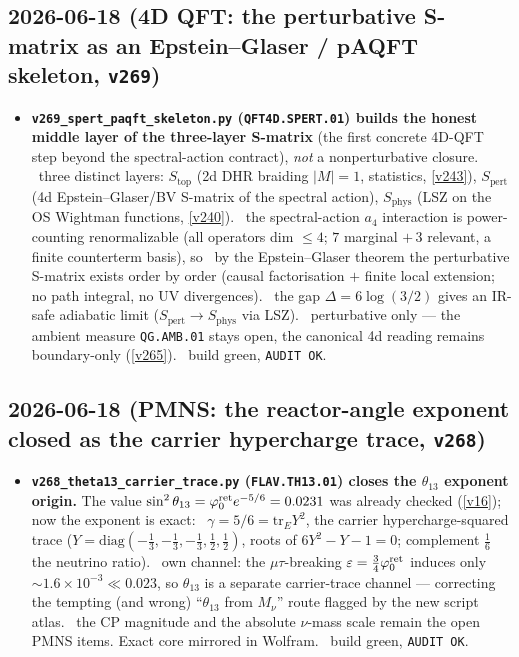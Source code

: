 \subsection*{2026-06-18 (4D QFT: the perturbative S-matrix as an Epstein--Glaser / pAQFT skeleton, \texttt{v269})}
\begin{itemize}
\item \textbf{\texttt{v269\_spert\_paqft\_skeleton.py} (\texttt{QFT4D.SPERT.01}) builds the honest middle
  layer of the three-layer S-matrix} (the first concrete 4D-QFT step beyond the spectral-action contract),
  \emph{not} a nonperturbative closure. \mE\ three distinct layers: $S_{\mathrm{top}}$ (2d DHR braiding
  $|M|{=}1$, statistics, \vref{v243}), $S_{\mathrm{pert}}$ (4d Epstein--Glaser/BV S-matrix of the spectral
  action), $S_{\mathrm{phys}}$ (LSZ on the OS Wightman functions, \vref{v240}). \mE\ the spectral-action
  $a_4$ interaction is power-counting renormalizable (all operators dim $\le4$; $7$ marginal $+\,3$ relevant,
  a finite counterterm basis), so \mC\ by the Epstein--Glaser theorem the perturbative S-matrix exists order
  by order (causal factorisation $+$ finite local extension; no path integral, no UV divergences). \mC\ the
  gap $\Delta=6\log(3/2)$ gives an IR-safe adiabatic limit ($S_{\mathrm{pert}}\to S_{\mathrm{phys}}$ via LSZ).
  \mO\ perturbative only --- the ambient measure \texttt{QG.AMB.01} stays open, the canonical 4d reading
  remains boundary-only (\vref{v265}). \mE\ build green, \texttt{AUDIT OK}.
\end{itemize}

\subsection*{2026-06-18 (PMNS: the reactor-angle exponent closed as the carrier hypercharge trace, \texttt{v268})}
\begin{itemize}
\item \textbf{\texttt{v268\_theta13\_carrier\_trace.py} (\texttt{FLAV.TH13.01}) closes the $\theta_{13}$
  exponent origin.} The value $\sin^2\theta_{13}=\varphi_0^{\mathrm{ret}} e^{-5/6}=0.0231$ was already checked (\vref{v16}); now
  the exponent is exact: \mE\ $\gamma=5/6=\mathrm{tr}_E Y^2$, the carrier hypercharge-squared trace
  ($Y=\mathrm{diag}(-\tfrac13,-\tfrac13,-\tfrac13,\tfrac12,\tfrac12)$, roots of $6Y^2-Y-1=0$; complement
  $\tfrac16$ the neutrino ratio). \mE\ own channel: the $\mu\tau$-breaking $\varepsilon=\tfrac34\varphi_0^{\mathrm{ret}}$
  induces only ${\sim}1.6\times10^{-3}\ll0.023$, so $\theta_{13}$ is a separate carrier-trace channel ---
  correcting the tempting (and wrong) ``$\theta_{13}$ from $M_\nu$'' route flagged by the new script atlas.
  \mO\ the CP magnitude and the absolute $\nu$-mass scale remain the open PMNS items. Exact core mirrored in
  Wolfram. \mE\ build green, \texttt{AUDIT OK}.
\end{itemize}

